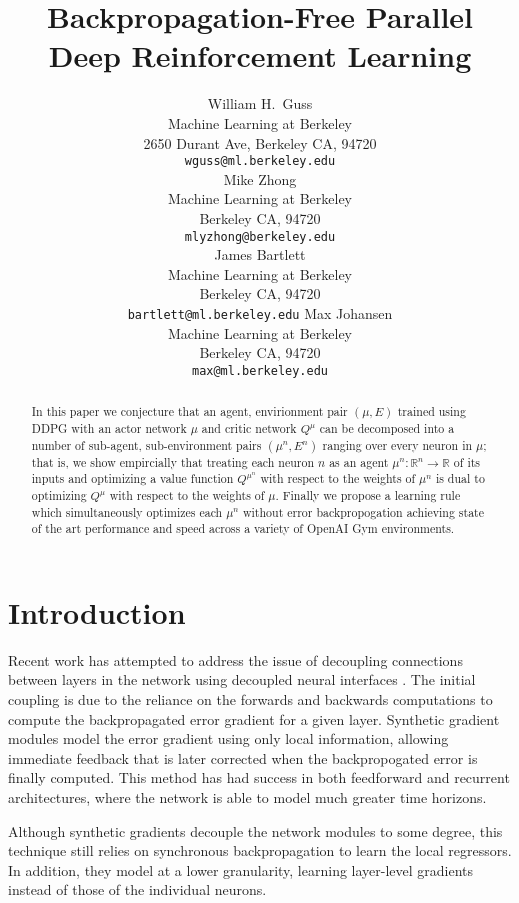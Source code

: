 \documentclass{article} %
\title{Backpropagation-Free Parallel Deep Reinforcement Learning}
\author{
William H.~Guss \\
Machine Learning at Berkeley\\
2650 Durant Ave, Berkeley CA, 94720 \\
\texttt{wguss@ml.berkeley.edu} \\
\And
Mike Zhong \\
Machine Learning at Berkeley \\
Berkeley CA, 94720 \\
\texttt{mlyzhong@berkeley.edu} \\
\And
James Bartlett\\
Machine Learning at Berkeley \\
Berkeley CA, 94720 \\
\texttt{bartlett@ml.berkeley.edu}
\And
Max Johansen \\
Machine Learning at Berkeley \\
Berkeley CA, 94720 \\
\texttt{max@ml.berkeley.edu}
}
\numberwithin{equation}{subsection}
\numberwithin{theorem}{subsection}
\theoremstyle{named}
\begin{document}
\maketitle

\begin{abstract}
    In this paper we conjecture that an agent, envirionment pair $(\mu, E)$ trained using DDPG with an actor network $\mu$ and critic network $Q^{\mu}$ can be decomposed into a number of sub-agent, sub-environment pairs  $(\mu^n, E^n)$ ranging over every neuron in $\mu$; that is, we show empircially that treating each neuron $n$ as an agent $\mu^n: \mathbb{R}^n \to \mathbb{R}$ of its inputs and optimizing a value function $Q^{\mu^n}$ with respect to the weights of $\mu^n$ is dual to optimizing $Q^\mu$ with respect to the weights of $\mu$. Finally we propose a learning rule which simultaneously optimizes each $\mu^n$ without error backpropogation achieving state of the art performance and speed across a variety of OpenAI Gym environments.
\end{abstract}
\listoftodos


\section{Introduction}


Recent work has attempted to address the issue of decoupling connections between layers in the network using decoupled neural interfaces \cite{jaderberg2016syngrad}. The initial coupling is due to the reliance on the forwards and backwards computations to compute the backpropagated error gradient for a given layer. Synthetic gradient modules model the error gradient using only local information, allowing immediate feedback that is later corrected when the backpropogated error is finally computed. This method has had success in both feedforward and recurrent architectures, where the network is able to model much greater time horizons.

Although synthetic gradients decouple the network modules to some degree, this technique still relies on synchronous backpropagation to learn the local regressors. In addition, they model at a lower granularity, learning layer-level gradients instead of those of the individual neurons.
\end{document}
